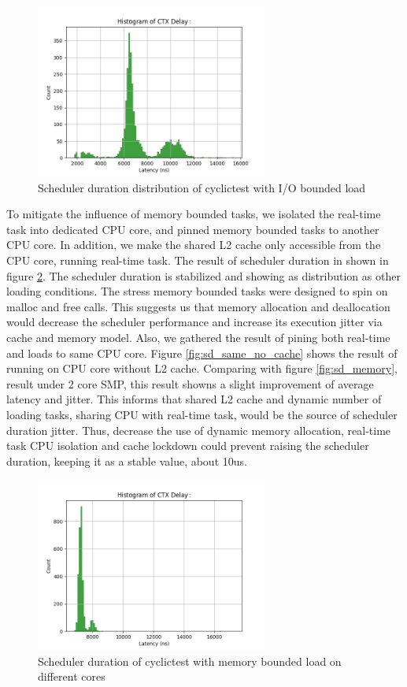 \documentclass[conference]{IEEEtran}
\begin{document}
    \begin{figure} \centering \includegraphics[width=3in]{img/sd-io.png} \caption{Scheduler duration distribution of
    cyclictest with I/O bounded load} \label{fig:sd_io} \end{figure}

    To mitigate the influence of memory bounded tasks, we isolated the real-time task into dedicated CPU core, and
    pinned memory bounded tasks to another CPU core. In addition, we make the shared L2 cache only accessible from the
    CPU core, running real-time task. The result of scheduler duration in shown in figure \ref{fig:sd_iso}. The
    scheduler duration is stabilized and showing as distribution as other loading conditions. The stress memory bounded
    tasks were designed to spin on malloc and free calls. This suggests us that memory allocation and deallocation would
    decrease the scheduler performance and increase its execution jitter via cache and memory model. Also, we gathered
    the result of pining both real-time and loads to same CPU core. Figure \ref{fig:sd_same_no_cache} shows the result
    of running on CPU core without L2 cache.  Comparing with figure \ref{fig:sd_memory}, result under 2 core SMP, this
    result showns a slight improvement of average latency and jitter. This informs that shared L2 cache and dynamic
    number of loading tasks, sharing CPU with real-time task, would be the source of scheduler duration jitter. Thus,
    decrease the use of dynamic memory allocation, real-time task CPU isolation and cache lockdown could prevent raising
    the scheduler duration, keeping it as a stable value, about 10us.

    \begin{figure} \centering \includegraphics[width=3in]{img/sd-iso.png} \caption{Scheduler duration of cyclictest with
    memory bounded load on different cores} \label{fig:sd_iso} \end{figure}
\end{document}
